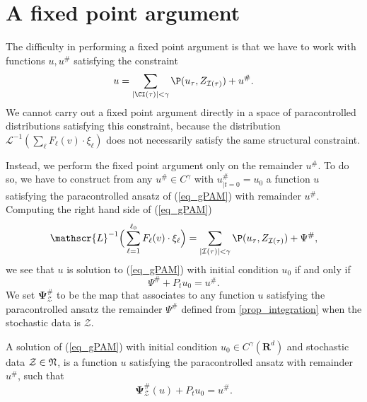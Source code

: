 \documentclass[11pt]{preprint}
\newcommand{\mcI}{\mathcal{I}}
\newcommand{\mcZ}{\mathcal{Z}}
\def\eqref#1{(\ref{#1})}
\newcommand{\bfR}{\mathbf{R}}
\newcommand{\scrL}{\mathscr{L}}
\begin{document}
	
	
	
	\section{A fixed point argument} \label{section_fixedpoint}
	
	The difficulty in performing a fixed point argument is that we have to work with functions $u,u^\#$ satisfying the constraint $$u=\sum_{|\CI(\tau)| < \gamma} \P(u_\tau,Z_{\mcI(\tau)})+u^\#.$$ We cannot carry out a fixed point argument directly in a space of paracontrolled distributions satisfying this constraint, because the distribution $\scrL^{-1}(\sum_\ell F_\ell(v)\cdot \xi_\ell) $ does not necessarily satisfy the same structural constraint.
	
	
	Instead, we perform the fixed point argument only on the remainder $u^\#$. To do so, we have to construct from any $u^\#\in C^\gamma$ with $u^\#_{|t=0}=u_0$ a function $u$ satisfying the paracontrolled ansatz of \eqref{eq_gPAM} with remainder $u^\#$. Computing the right hand side of \eqref{eq_gPAM}
	$$
	\scrL^{-1}\Big(\sum_{\ell=1}^{\ell_0} F_\ell(v)\cdot \xi_\ell \Big)   = \sum_{|\mcI(\tau)|<\gamma} \P(u_\tau,Z_{\mcI(\tau)}) + \Psi^\#, 
	$$
	we see that $u$ is solution to \eqref{eq_gPAM} with initial condition $u_0$ if and only if $$\Psi^\# + P_t u_0=u^\#.$$
	We set $\boldsymbol{\Psi}_{\mcZ}^\#$ to be the map that associates to any function $u$ satisfying the paracontrolled ansatz the remainder $\Psi^\#$ defined from \ref{prop_integration} when the stochastic data is $\mcZ$.
	
	
	\begin{definition}\label{def_solution_EqPAM}
		A solution of  \eqref{eq_gPAM} with initial condition $u_0\in C^\gamma(\bfR^d)$ and stochastic data $\mcZ\in{\frak N}$, is a function $u$ satisfying the paracontrolled ansatz with remainder $u^\#$, such that 
		$$
		\boldsymbol{\Psi}_{\mcZ}^\#(u) + P_t u_0= u^\#.
		$$ 
	\end{definition}
	
	
	
\end{document}
